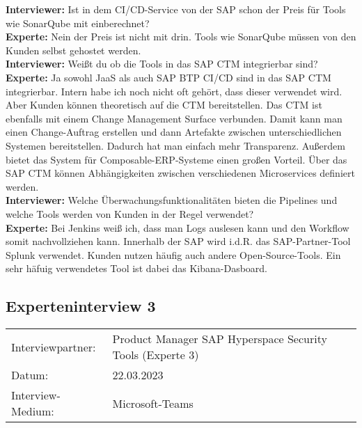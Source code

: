 \begin{linenumbers}
    \textbf{Interviewer:} Ist in dem CI/CD-Service von der SAP schon der Preis für Tools wie SonarQube mit einberechnet?\\
    \textbf{Experte:} Nein der Preis ist nicht mit drin. Tools wie SonarQube müssen von den Kunden selbst gehostet werden.\\
    \textbf{Interviewer:} Weißt du ob die Tools in das SAP CTM integrierbar sind?\\
    \textbf{Experte:} Ja sowohl JaaS als auch SAP BTP CI/CD sind in das SAP CTM integrierbar. Intern habe ich noch nicht oft gehört, dass dieser verwendet wird. Aber Kunden können theoretisch auf die CTM bereitstellen. Das CTM ist ebenfalls mit einem Change Management Surface verbunden. Damit kann man einen Change-Auftrag erstellen und dann Artefakte zwischen unterschiedlichen Systemen bereitstellen. Dadurch hat man einfach mehr Transparenz. Außerdem bietet das System für Composable-ERP-Systeme einen großen Vorteil. Über das SAP CTM können Abhängigkeiten zwischen verschiedenen Microservices definiert werden.\\
    \textbf{Interviewer:} Welche Überwachungsfunktionalitäten bieten die Pipelines und welche Tools werden von Kunden in der Regel verwendet?\\
    \textbf{Experte:} Bei Jenkins weiß ich, dass man Logs auslesen kann und den Workflow somit nachvollziehen kann. Innerhalb der SAP wird i.d.R. das SAP-Partner-Tool Splunk verwendet. Kunden nutzen häufig auch andere Open-Source-Tools. Ein sehr häfuig verwendetes Tool ist dabei das Kibana-Dasboard.
\end{linenumbers}
\newpage
\resetlinenumber
\subsection{Experteninterview 3}
	\begin{tabular}{ l l }
		Interviewpartner: & Product Manager SAP Hyperspace Security Tools (Experte 3)\\
		Datum: & 22.03.2023\\
		Interview-Medium: & Microsoft-Teams\\
\end{tabular}\\\\

